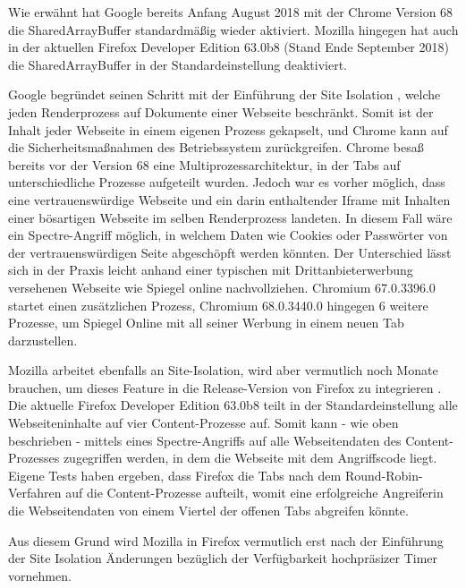 Wie erwähnt hat Google bereits Anfang August 2018 mit der Chrome Version 68 \cite{ChromeSharedArrayBufferAgain} die SharedArrayBuffer standardmäßig wieder aktiviert.
Mozilla hingegen hat auch in der aktuellen Firefox Developer Edition 63.0b8 (Stand Ende September 2018) die SharedArrayBuffer in der Standardeinstellung deaktiviert.

Google begründet seinen Schritt mit der Einführung der Site Isolation \cite{ChromeSiteIsolation}, welche jeden Renderprozess auf Dokumente einer Webseite beschränkt. Somit ist der Inhalt jeder Webseite in einem eigenen Prozess gekapselt, und Chrome kann auf die Sicherheitsmaßnahmen des Betriebssystem zurückgreifen.
Chrome besaß bereits vor der Version 68 eine Multiprozessarchitektur, in der Tabs auf unterschiedliche Prozesse aufgeteilt wurden.
Jedoch war es vorher möglich, dass eine vertrauenswürdige Webseite und ein darin enthaltender Iframe mit Inhalten einer bösartigen Webseite im selben Renderprozess landeten.
In diesem Fall wäre ein Spectre-Angriff möglich, in welchem Daten wie Cookies oder Passwörter von der vertrauenswürdigen Seite abgeschöpft werden könnten.
Der Unterschied lässt sich in der Praxis leicht anhand einer typischen mit Drittanbieterwerbung versehenen Webseite wie Spiegel online nachvollziehen.
Chromium 67.0.3396.0 startet einen zusätzlichen Prozess, Chromium 68.0.3440.0 hingegen 6 weitere Prozesse, um Spiegel Online mit all seiner Werbung in einem neuen Tab darzustellen.


Mozilla arbeitet ebenfalls an Site-Isolation, wird aber vermutlich noch Monate brauchen, um dieses Feature in die Release-Version von Firefox zu integrieren \cite{FirefoxSiteIsolation}.
Die aktuelle Firefox Developer Edition 63.0b8 teilt in der Standardeinstellung alle Webseiteninhalte auf vier Content-Prozesse auf. 
Somit kann - wie oben beschrieben - mittels eines Spectre-Angriffs auf alle Webseitendaten des Content-Prozesses zugegriffen werden, in dem die Webseite mit dem Angriffscode liegt.
Eigene Tests haben ergeben, dass Firefox die Tabs nach dem Round-Robin-Verfahren auf die Content-Prozesse aufteilt, womit eine erfolgreiche Angreiferin die Webseitendaten von einem Viertel der offenen Tabs abgreifen könnte.

Aus diesem Grund wird Mozilla in Firefox vermutlich erst nach der Einführung der Site Isolation Änderungen bezüglich der Verfügbarkeit hochpräsizer Timer vornehmen.

